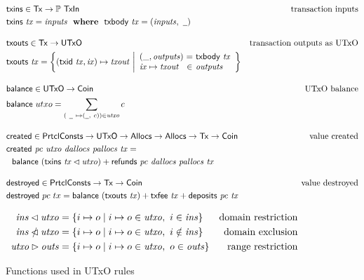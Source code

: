 \documentclass[11pt,a4paper]{article}
\newcommand{\Tx}{\type{Tx}}
\newcommand{\UTxO}{\type{UTxO}}
\newcommand{\Coin}{\type{Coin}}
\newcommand{\PrtclConsts}{\type{PrtclConsts}}
\newcommand{\Allocs}{\type{Allocs}}
\newcommand{\TxIn}{\type{TxIn}}
\newcommand{\txins}[1]{\fun{txins}~ \var{#1}}
\newcommand{\txouts}[1]{\fun{txouts}~ \var{#1}}
\newcommand{\balance}[1]{\fun{balance}~ \var{#1}}
\newcommand{\deposits}[2]{\fun{deposits}~ \var{#1} ~ \var{#2}}
\newcommand{\refunds}[4]{\fun{refunds}~ \var{#1}~ \var{#2}~ \var{#3}~ \var{#4}}
\newcommand{\created}[5]{\fun{created}~ \var{#1}~ \var{#2}~ \var{#3}~ \var{#4}~ \var{#5}}
\newcommand{\txbody}[1]{\fun{txbody}~ \var{#1}}
\newcommand{\txfee}[1]{\fun{txfee}~ \var{#1}}
\newcommand{\wcard}[0]{\underline{\phantom{a}}}
\theoremstyle{definition}
\theoremstyle{definition}
\begin{document}
\begin{figure}
  \begin{align*}
    & \fun{txins} \in \Tx \to \powerset{\TxIn}
    & \text{transaction inputs} \\
    & \txins{tx} = \var{inputs} \where \txbody{tx} = (\var{inputs}, ~\wcard)
    \nextdef
    & \fun{txouts} \in \Tx \to \UTxO
    & \text{transaction outputs as UTxO} \\
    & \fun{txouts} ~ \var{tx} =
      \left\{ (\fun{txid} ~ \var{tx}, \var{ix}) \mapsto \var{txout} ~
      \middle| \begin{array}{l@{~}c@{~}l}
                 (\_, \var{outputs}) & = & \txbody{tx} \\
                 \var{ix} \mapsto \var{txout} & \in & \var{outputs}
               \end{array}
      \right\}
    \nextdef
    & \fun{balance} \in \UTxO \to \Coin
    & \text{UTxO balance} \\
    & \fun{balance} ~ utxo = \sum_{(~\wcard ~ \mapsto (\wcard, ~c)) \in \var{utxo}} c
    \nextdef
    & \fun{created} \in \PrtclConsts \to \UTxO \to \Allocs \to \Allocs \to \Tx \to \Coin
    & \text{value created} \\
    & \created{pc}{utxo}{dallocs}{pallocs}{tx} = \\
    & ~~\balance{(\txins{tx} \restrictdom \var{utxo})} + \refunds{pc}{dallocs}{pallocs}{tx}
    \nextdef
    & \fun{destroyed} \in \PrtclConsts \to \Tx \to \Coin
    & \text{value destroyed} \\
    & \fun{destroyed} ~ pc ~ tx =
      \balance{(\txouts{tx})}  + \txfee{tx} + \deposits{pc}{tx}\\
  \end{align*}

  \begin{align*}
    \mathit{ins} \lhd \mathit{utxo}
    & = \{ i \mapsto o \mid i \mapsto o \in \mathit{utxo}, ~ i \in \mathit{ins} \}
    & \text{domain restriction}
    \\
    \mathit{ins} \mathbin{\slashed{\lhd}} \mathit{utxo}
    & = \{ i \mapsto o \mid i \mapsto o \in \mathit{utxo}, ~ i \notin \mathit{ins} \}
    & \text{domain exclusion}
    \\
    \mathit{utxo} \rhd \mathit{outs}
    & = \{ i \mapsto o \mid i \mapsto o \in \mathit{utxo}, ~ o \in \mathit{outs} \}
    & \text{range restriction}
  \end{align*}
  \caption{Functions used in UTxO rules}
  \label{fig:derived-defs:utxo}
\end{figure}
\end{document}
